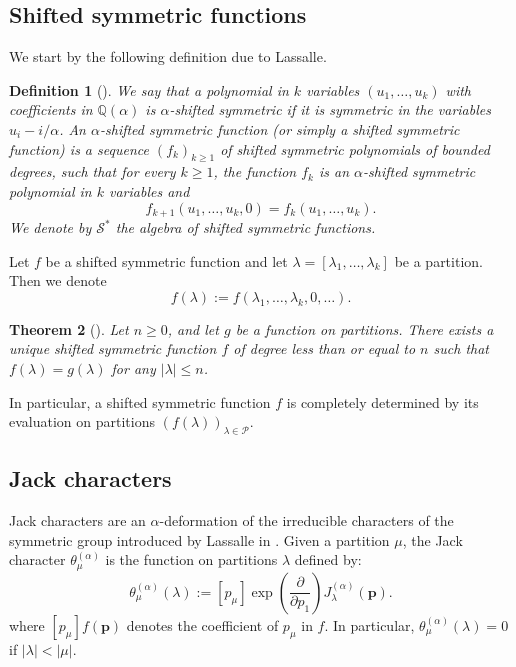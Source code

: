\documentclass[12pt]{amsart}
\newtheorem{thm}{Theorem}[section]
\newtheorem{defi}[thm]{Definition}
\theoremstyle{remark}
\newcommand{\bfp}{\boldsymbol{p}}
\newcommand{\Jch}{\theta^{(\alpha)}}
\newcommand{\J}{{J}^{(\alpha)}}
\newcommand{\YY}{\mathcal{P}}
\newcommand{\mcSstar}{\mathcal{S}^*}
\begin{document}
\subsection{Shifted symmetric functions}
 We start by the following definition due to Lassalle.
\begin{defi}[\cite{Lassalle2008b}]
We say that a polynomial in $k$ variables
$(u_1,\dots,u_k)$ with coefficients in $\mathbb Q (\alpha)$ is
\textit{$\alpha$-shifted symmetric} if it is symmetric in the variables $u_i-i/\alpha$.
An $\alpha$-shifted symmetric function (or simply a shifted symmetric function)  is a sequence
$(f_k)_{k\geq1}$ of shifted symmetric polynomials of bounded degrees, such that for every $k\geq 1$, the function $f_k$ is
an $\alpha$-shifted symmetric polynomial in $k$ variables and 
\begin{equation}\label{eq shifted functions}
  f_{k+1}(u_1,\dots,u_k,0)=f_k(u_1,\dots,u_k).  
\end{equation}
We denote by $\mcSstar$ the algebra of shifted symmetric functions.
\end{defi}


Let $f$ be a shifted symmetric function and let $\lambda =
[\lambda_1,\dots,\lambda_k]$ be a partition. Then we denote
$$f(\lambda):=f(\lambda_1,\dots, \lambda_{k},0,\dots).$$ 

\begin{thm}[\cite{KnopSahi1996}]\label{thm:Knop_Sahi}
    Let $n\geq 0$, and let $g$ be a function on partitions. There exists a unique shifted symmetric function $f$ of degree less than or equal to $n$ such that $f(\lambda)=g(\lambda)$ for any $|\lambda|\leq n$.
\end{thm}

In particular, a shifted symmetric function $f$ is completely determined by its evaluation on partitions $(f(\lambda))_{\lambda\in\YY}$. 

\subsection{Jack characters}
Jack characters are an $\alpha$-deformation of the irreducible characters of the symmetric group introduced by Lassalle in \cite{Lassalle2008b}.
Given a partition $\mu$, the Jack character $\Jch_\mu$ is the function on partitions $\lambda$ defined by:
\begin{equation}\label{eq:def_Jch}
   \theta^{(\alpha)}_\mu(\lambda):=[p_\mu]\exp\left(\frac{\partial}{\partial p_1}\right)\J_\lambda(\bfp). 
\end{equation}
where  $[p_\mu] f(\bfp)$ denotes the coefficient of $p_\mu$ in $f$. In particular, $\Jch_\mu(\lambda)=0$ if $|\lambda|<|\mu|$.
\end{document}
